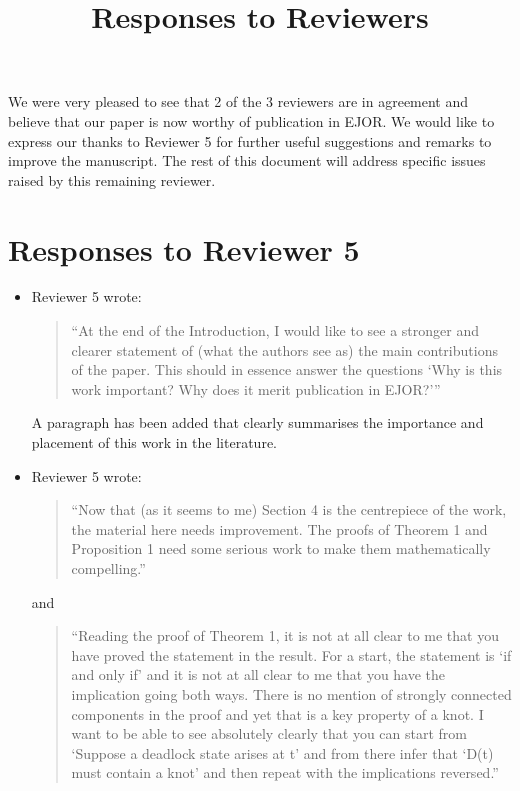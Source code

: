 \documentclass{article}
\title{Responses to Reviewers}
\author{}
\date{}
\begin{document}
\maketitle

We were very pleased to see that 2 of the 3 reviewers are in agreement and
believe that our paper is now worthy of publication in EJOR. 
We would like to express our thanks to Reviewer 5 for further useful suggestions
and remarks to improve the manuscript.
The rest of this document will address specific issues raised by this remaining
reviewer.

\section*{Responses to Reviewer 5}

\begin{itemize}

\item Reviewer 5 wrote:
\begin{quote}
``At the end of the Introduction, I would like to see a stronger and clearer
statement of (what the authors see as) the main contributions of the paper.
This should in essence answer the questions ‘Why is this work important? Why
does it merit publication in EJOR?’''
\end{quote}

A paragraph has been added that clearly summarises the importance and placement
of this work in the literature.

\item Reviewer 5 wrote:
\begin{quote}
``Now that (as it seems to me) Section 4 is the centrepiece of the work, the
material here needs improvement. The proofs of Theorem 1 and Proposition 1 need
some serious work to make them mathematically compelling.''
\end{quote}

and

\begin{quote}
``Reading the proof of Theorem 1, it is not at all clear to me that you have
proved the statement in the result. For a start, the statement is ‘if and only
if’ and it is not at all clear to me that you have the implication going both
ways. There is no mention of strongly connected components in the proof and yet
that is a key property of a knot. I want to be able to see absolutely clearly
that you can start from ‘Suppose a deadlock state arises at t’ and from there
infer that ‘D(t) must contain a knot’ and then repeat with the implications
reversed.''
\end{quote}


\end{itemize}
\end{document}
